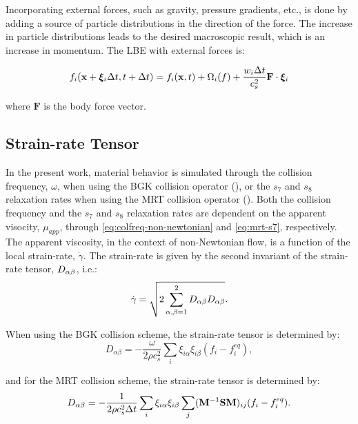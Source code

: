 Incorporating external forces, such as gravity, pressure gradients, etc., is done by adding a source of particle distributions in the direction of the force.
The increase in particle distributions leads to the desired macroscopic result, which is an increase in momentum.
The LBE with external forces is:

\begin{equation}
f_i(\mathbf{x} + \boldsymbol{\xi}_i \Delta t, t + \Delta t) = f_i(\mathbf{x}, t) + \Omega_i(f) + \frac{w_i \Delta t}{c_s^2} \mathbf{F} \cdot \boldsymbol{\xi}_i
\end{equation}

\noindent where $\mathbf{F}$ is the body force vector.

\subsection{Strain-rate Tensor}

In the present work, material behavior is simulated through the collision frequency, $\omega$, when using the BGK collision operator (), or the $s_7$ and $s_8$ relaxation rates when using the MRT collision operator ().
Both the collision frequency and the $s_7$ and $s_8$ relaxation rates are dependent on the apparent visocity, $\mu_{app}$, through \eqref{eq:colfreq-non-newtonian} and \eqref{eq:mrt-s7}, respectively.
The apparent viscosity, in the context of non-Newtonian flow, is a function of the local strain-rate, $\dot{\gamma}$.
The strain-rate is given by the second invariant of the strain-rate tensor, $D_{\alpha\beta}$, i.e.:
\begin{equation} \label{eq:second-invariant}
\dot{\gamma} = \sqrt{2 \sum_{\alpha,\beta=1}^{2} D_{\alpha\beta} D_{\alpha\beta}}.
\end{equation}

\noindent When using the BGK collision scheme, the strain-rate tensor is determined by:
\begin{equation} \label{eq:srtensor-bgk}
D_{\alpha \beta} = -\frac{\omega}{2 \rho c_s^2} \sum_i \xi_{i \alpha} \xi_{i \beta} (f_i - f^{eq}_i),
\end{equation}

\noindent and for the MRT collision scheme, the strain-rate tensor is determined by:
\begin{equation} \label{eq:srtensor-mrt}
D_{\alpha \beta} = -\frac{1}{2 \rho c_s^2 \Delta t} \sum_i \xi_{i \alpha} \xi_{i \beta} \sum_j (\mathbf{M}^{-1} \mathbf{S} \mathbf{M})_{ij}(f_i - f^{eq}_i).
\end{equation}

